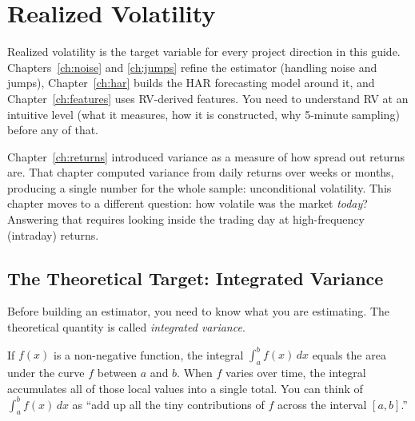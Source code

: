 \chapter{Realized Volatility}
\label{ch:rv}

\begin{application}
Realized volatility is the target variable for every project direction in this guide.
Chapters~\ref{ch:noise} and \ref{ch:jumps} refine the estimator (handling noise and jumps), Chapter~\ref{ch:har} builds the HAR forecasting model around it, and Chapter~\ref{ch:features} uses RV-derived features.
You need to understand RV at an intuitive level (what it measures, how it is constructed, why 5-minute sampling) before any of that.
\end{application}

Chapter~\ref{ch:returns} introduced variance as a measure of how spread out returns are.
That chapter computed variance from daily returns over weeks or months, producing a single number for the whole sample: unconditional volatility.
This chapter moves to a different question: how volatile was the market \emph{today}?
Answering that requires looking inside the trading day at high-frequency (intraday) returns.

\section{The Theoretical Target: Integrated Variance}
\label{sec:integrated-variance}

Before building an estimator, you need to know what you are estimating.
The theoretical quantity is called \emph{integrated variance}.

\begin{prereq}
If $f(x)$ is a non-negative function, the integral $\int_a^b f(x)\,dx$ equals the area under the curve $f$ between $a$ and $b$.
When $f$ varies over time, the integral accumulates all of those local values into a single total.
You can think of $\int_a^b f(x)\,dx$ as ``add up all the tiny contributions of $f$ across the interval $[a,b]$.''
\end{prereq}

